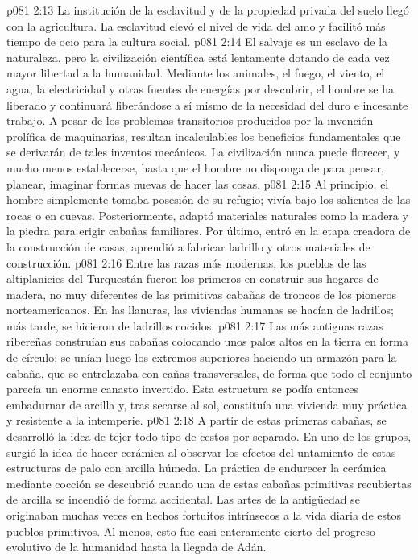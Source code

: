 \vs p081 2:13 \pc La institución de la esclavitud y de la propiedad privada del suelo llegó con la agricultura. La esclavitud elevó el nivel de vida del amo y facilitó más tiempo de ocio para la cultura social.
\vs p081 2:14 El salvaje es un esclavo de la naturaleza, pero la civilización científica está lentamente dotando de cada vez mayor libertad a la humanidad. Mediante los animales, el fuego, el viento, el agua, la electricidad y otras fuentes de energías por descubrir, el hombre se ha liberado y continuará liberándose a sí mismo de la necesidad del duro e incesante trabajo. A pesar de los problemas transitorios producidos por la invención prolífica de maquinarias, resultan incalculables los beneficios fundamentales que se derivarán de tales inventos mecánicos. La civilización nunca puede florecer, y mucho menos establecerse, hasta que el hombre no disponga de  para pensar, planear, imaginar formas nuevas de hacer las cosas.
\vs p081 2:15 \pc Al principio, el hombre simplemente tomaba posesión de su refugio; vivía bajo los salientes de las rocas o en cuevas. Posteriormente, adaptó materiales naturales como la madera y la piedra para erigir cabañas familiares. Por último, entró en la etapa creadora de la construcción de casas, aprendió a fabricar ladrillo y otros materiales de construcción.
\vs p081 2:16 Entre las razas más modernas, los pueblos de las altiplanicies del Turquestán fueron los primeros en construir sus hogares de madera, no muy diferentes de las primitivas cabañas de troncos de los pioneros norteamericanos. En las llanuras, las viviendas humanas se hacían de ladrillos; más tarde, se hicieron de ladrillos cocidos.
\vs p081 2:17 Las más antiguas razas ribereñas construían sus cabañas colocando unos palos altos en la tierra en forma de círculo; se unían luego los extremos superiores haciendo un armazón para la cabaña, que se entrelazaba con cañas transversales, de forma que todo el conjunto parecía un enorme canasto invertido. Esta estructura se podía entonces embadurnar de arcilla y, tras secarse al sol, constituía una vivienda muy práctica y resistente a la intemperie.
\vs p081 2:18 A partir de estas primeras cabañas, se desarrolló la idea de tejer todo tipo de cestos por separado. En uno de los grupos, surgió la idea de hacer cerámica al observar los efectos del untamiento de estas estructuras de palo con arcilla húmeda. La práctica de endurecer la cerámica mediante cocción se descubrió cuando una de estas cabañas primitivas recubiertas de arcilla se incendió de forma accidental. Las artes de la antigüedad se originaban muchas veces en hechos fortuitos intrínsecos a la vida diaria de estos pueblos primitivos. Al menos, esto fue casi enteramente cierto del progreso evolutivo de la humanidad hasta la llegada de Adán.
